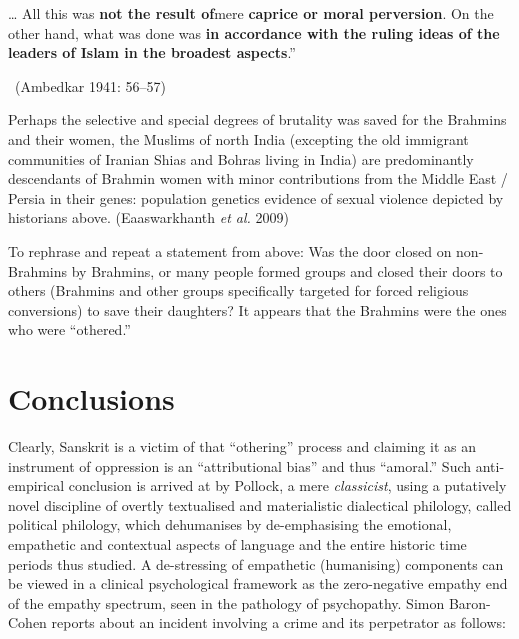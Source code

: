 \begin{myquote}
… All this was \textbf{not the result of}mere \textbf{caprice or moral perversion}. On the other hand, what was done was \textbf{in accordance with the ruling ideas of the leaders of Islam in the broadest aspects}.” 

~\hfill (Ambedkar 1941: 56–57)
\end{myquote}

Perhaps the selective and special degrees of brutality was saved for the Brahmins and their women, the Muslims of north India (excepting the old immigrant communities of Iranian Shias and Bohras living in India) are predominantly descendants of Brahmin women with minor contributions from the Middle East / Persia in their genes: population genetics evidence of sexual violence depicted by historians above. (Eaaswarkhanth \textit{et al.} 2009)

To rephrase and repeat a statement from above: Was the door closed on non-Brahmins by Brahmins, or many people formed groups and closed their doors to others (Brahmins and other groups specifically targeted for forced religious conversions) to save their daughters? It appears that the Brahmins were the ones who were “othered.”

\vspace{-.3cm}

\section*{Conclusions}

Clearly, Sanskrit is a victim of that “othering” process and claiming it as an instrument of oppression is an “attributional bias” and thus “amoral.” Such anti-empirical conclusion is arrived at by Pollock, a mere \textit{classicist}, using a putatively novel discipline of overtly textualised and materialistic dialectical philology, called political philology, which dehumanises by de-emphasising the emotional, empathetic and contextual aspects of language and the entire historic time periods thus studied. A de-stressing of empathetic (humanising) components can be viewed in a clinical psychological framework as the zero-negative empathy end of the empathy spectrum, seen in the pathology of psychopathy. Simon Baron-Cohen reports about an incident involving a crime and its perpetrator as follows:

